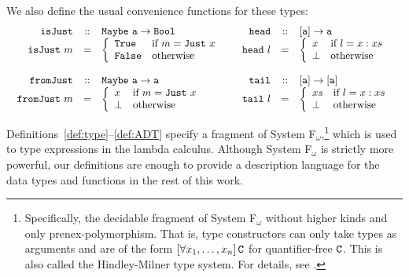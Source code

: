 \noindent
We also define the usual convenience functions for these types:
$$
	\begin{array}{l l}
		\begin{array}{r c l}
			\mathtt{isJust} & :: & \mathtt{Maybe\ a \rightarrow Bool}\\
			\mathtt{isJust}\ m & = & \left\{
				\begin{array}{l l}
					\mathtt{True} & \textnormal{if } m = \mathtt{Just}\ x\\
					\mathtt{False} & \textnormal{otherwise}\\
				\end{array}
			\right.\\
			\\
			\mathtt{fromJust} & :: & \mathtt{Maybe\ a \rightarrow a}\\
			\mathtt{fromJust}\ m & = & \left\{
				\begin{array}{l l}
					x & \textnormal{if } m = \mathtt{Just}\ x\\
					\bot & \textnormal{otherwise}\\
				\end{array}
			\right.\\
		\end{array}
		&
		\begin{array}{r c l}
			\mathtt{head} & :: & \mathtt{[a] \rightarrow a}\\
			\mathtt{head}\ l & = & \left\{
				\begin{array}{l l}
					x & \textnormal{if } l = x:xs\\
					\bot & \textnormal{otherwise}\\
				\end{array}
			\right.\\
			\\
			\mathtt{tail} & :: & \mathtt{[a] \rightarrow [a]}\\
			\mathtt{tail}\ l & = & \left\{
				\begin{array}{l l}
					xs & \textnormal{if } l = x:xs\\
					\bot & \textnormal{otherwise}\\
				\end{array}
			\right.\\
		\end{array}
	\end{array}
$$

Definitions~\ref{def:type}--\ref{def:ADT} specify a fragment of System F$_\omega$,\footnote{Specifically, the decidable fragment of System F$_\omega$ without higher kinds and only prenex-polymorphism. That is, type constructors can only take types as arguments and are of the form $\left[\forall x_1,\dots,x_n \right] \mathtt{C}$ for quantifier-free $\mathtt{C}$. This is also called the Hindley-Milner type system. For details, see \cite{barendregt91}.} which is used to type expressions in the lambda calculus. Although System F$_\omega$ is strictly more powerful, our definitions are enough to provide a description language for the data types and functions in the rest of this work.


